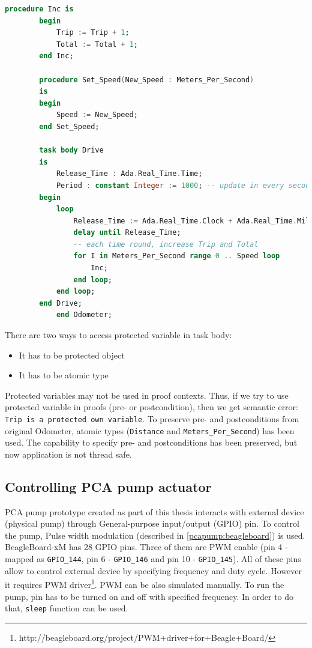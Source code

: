 \begin{lstlisting}[language=ada, frame=single, gobble=0, caption={Multitasking Odometer}]
	    procedure Inc is
	    begin
	        Trip := Trip + 1;
	        Total := Total + 1;
	    end Inc;
	    
	    procedure Set_Speed(New_Speed : Meters_Per_Second)
	    is
	    begin
	        Speed := New_Speed;
	    end Set_Speed;    
	    
	    task body Drive
	    is
	        Release_Time : Ada.Real_Time.Time;
	        Period : constant Integer := 1000; -- update in every second
	    begin
	        loop
	            Release_Time := Ada.Real_Time.Clock + Ada.Real_Time.Milliseconds(Period);
	            delay until Release_Time;
	            -- each time round, increase Trip and Total
	            for I in Meters_Per_Second range 0 .. Speed loop
	                Inc;
	            end loop;            
	        end loop;
	    end Drive;
	    	end Odometer;
\end{lstlisting} 
\label{listing:Odometer2005Tasking}

There are two ways to access protected variable in task body:
\begin{itemize}
    \item It has to be protected object
    \item It has to be atomic type
\end{itemize}

Protected variables may not be used in proof contexts. Thus, if we try to use protected variable in proofs (pre- or postcondition), then we get semantic error: \lstinline{Trip is a protected own variable}. To preserve pre- and postconditions from original Odometer, atomic types (\lstinline{Distance} and \lstinline{Meters_Per_Second}) has been used. The capability to specify pre- and postconditions has been preserved, but now application is not thread safe.


\subsection{Controlling PCA pump actuator}
\label{pcapumpimpl:beagleboard:pcapumpmotor}

PCA pump prototype created as part of this thesis interacts with external device (physical pump) through General-purpose input/output (GPIO) pin. To control the pump, Pulse width modulation (described in \ref{pcapump:beagleboard}) is used. BeagleBoard-xM has 28 GPIO pins. Three of them are PWM enable (pin 4 - mapped as \lstinline{GPIO_144}, pin 6 - \lstinline{GPIO_146} and pin 10 - \lstinline{GPIO_145}). All of these pins allow to control external device by specifying frequency and duty cycle. However it requires PWM driver\footnote{http://beagleboard.org/project/PWM+driver+for+Beagle+Board/}. PWM can be also simulated manually. To run the pump, pin has to be turned on and off with specified frequency. In order to do that, \lstinline{sleep} function can be used. 

